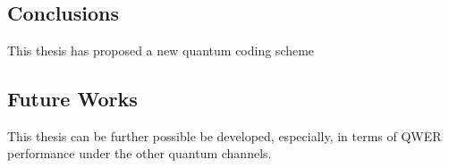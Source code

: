 \chapter{\babLima}
\section{Conclusions}
This thesis has proposed a new quantum coding scheme 

\section{Future Works}
{\color{black}This thesis can be further possible be developed, especially, in terms of QWER performance under the other quantum channels.}

